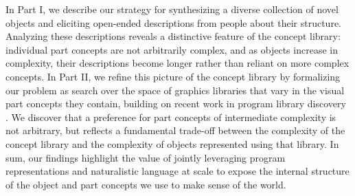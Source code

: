 \documentclass[10pt,letterpaper]{article}
\begin{document}
In Part I, we describe our strategy for synthesizing a diverse collection of novel objects and eliciting open-ended descriptions from people about their structure.
Analyzing these descriptions reveals a distinctive feature of the concept library: individual part concepts are not arbitrarily complex, and as objects increase in complexity, their descriptions become longer rather than reliant on more complex concepts.
In Part II, we refine this picture of the concept library by formalizing our problem as search over the space of graphics libraries that vary in the visual part concepts they contain, building on recent work in program library discovery .
We discover that a preference for part concepts of intermediate complexity is not arbitrary, but reflects a fundamental trade-off between the complexity of the concept library and the complexity of objects represented using that library. 
In sum, our findings highlight the value of jointly leveraging program representations and naturalistic language at scale to expose the internal structure of the object and part concepts we use to make sense of the world. 


\end{document}
